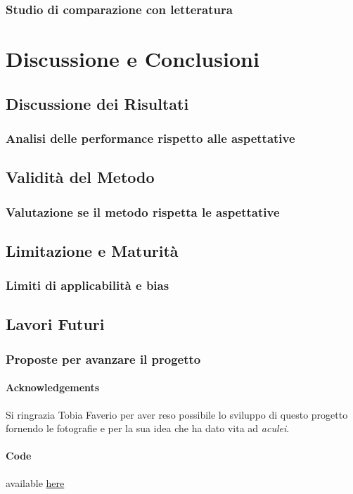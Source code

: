 \documentclass[12pt,a4paper,twoside]{article}
\begin{document}
\subsubsection{Studio di comparazione con letteratura}

\newpage
\section{Discussione e Conclusioni}

\subsection{Discussione dei Risultati}
\subsubsection{Analisi delle performance rispetto alle aspettative}

\subsection{Validità del Metodo}
\subsubsection{Valutazione se il metodo rispetta le aspettative}

\subsection{Limitazione e Maturità}
\subsubsection{Limiti di applicabilità e bias}

\subsection{Lavori Futuri}
\subsubsection{Proposte per avanzare il progetto}

\newpage
\paragraph{Acknowledgements} Si ringrazia Tobia Faverio per aver reso possibile lo sviluppo di 
questo progetto fornendo le fotografie e per la sua idea che ha dato vita ad \textit{aculei}.

\paragraph{Code} available \href{https://github.com/micheledinelli/aculei-ai}{here}

\newpage
\begin{refcontext}[sorting=none]
    \printbibliography
\end{refcontext}
\end{document}
